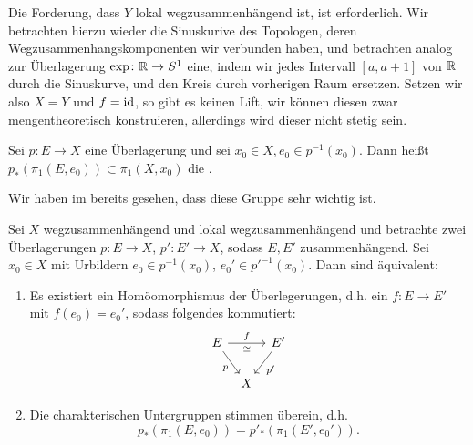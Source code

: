 \begin{example}
    Die Forderung, dass $Y$ lokal wegzusammenhängend ist, ist erforderlich. Wir betrachten hierzu wieder die Sinuskurive des Topologen, deren Wegzusammenhangskomponenten wir verbunden haben, und betrachten analog zur Überlagerung  $\exp \colon  \mathbb{R} \to  S^1$ eine, indem wir jedes Intervall $[a,a+1]$ von  $\mathbb{R}$ durch die Sinuskurve, und den Kreis durch vorherigen Raum ersetzen.
    Setzen wir also $X = Y$ und  $f = \mathrm{id}$, so gibt es keinen Lift, wir können diesen zwar mengentheoretisch konstruieren, allerdings wird dieser nicht stetig sein.
\end{example}

\begin{definition}\label{def:charakteristische-untegruppe}
    Sei $p\colon  E \to  X$ eine Überlagerung und sei $x_0\in X, e_0\in p^{-1} (x_0)$. Dann heißt $p_*(\pi_1(E,e_0))\subset \pi_1(X,x_0)$ die . 
\end{definition}

\begin{oral}
    Wir haben im  bereits gesehen, dass diese Gruppe sehr wichtig ist.
\end{oral}

\begin{theorem}\label{thm:äquivalenz-von-überlagerungen-über-lokal-wegzsuammenhängendem-wegzusammenhängendem-raum}
    Sei $X$ wegzusammenhängend und lokal wegzusammenhängend und betrachte zwei Überlagerungen $p\colon  E\to X$, $p' \colon  E' \to  X$, sodass $E,E'$ zusammenhängend. Sei  $x_0\in X$ mit Urbildern $e_0\in p^{-1} (x_0)$, $e_0' \in p'^{-1} (x_0)$. Dann sind äquivalent:
    \begin{enumerate}[1)]
        \item Es existiert ein Homöomorphismus der Überlegerungen, d.h. ein $f\colon  E \to  E'$ mit $f(e_0) = e_0'$, sodass folgendes kommutiert:
            \[
            \begin{tikzcd}[column sep = tiny]
                E \ar{rr}{f}[swap]{\cong} \ar[swap]{dr}{p} & & E' \ar{dl}{p'} \\
            & X
            \end{tikzcd}
            \]
        \item Die charakterischen Untergruppen stimmen überein, d.h.
            \[
                p_*(\pi_1(E,e_0)) = p'_*(\pi_1(E',e_0'))
            .\] 
    \end{enumerate}
\end{theorem}

